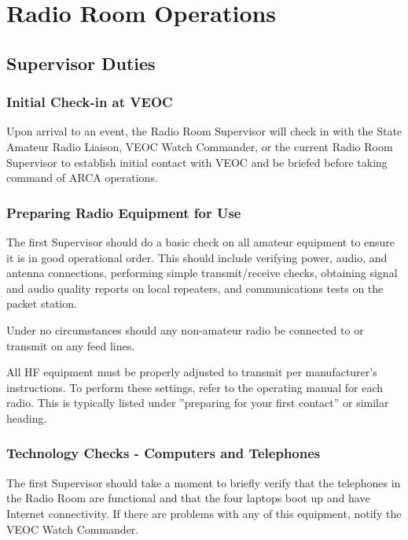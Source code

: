 \documentclass[pdflatex,letterpaper,twoside,12pt]{book}
\begin{document}
\chapter{Radio Room Operations}

\section{Supervisor Duties}

\subsection{Initial Check-in at VEOC}

Upon arrival to an event, the Radio Room Supervisor will check in with the State Amateur Radio Liaison, VEOC Watch Commander, or the current Radio Room Supervisor to establish initial contact with VEOC and be briefed before taking command of ARCA operations.

\subsection{Preparing Radio Equipment for Use}

The first Supervisor should do a basic check on all amateur equipment to ensure it is in good operational order.  This should include verifying power, audio, and antenna connections, performing simple transmit/receive checks, obtaining signal and audio quality reports on local repeaters, and communications tests on the packet station.

Under no circumstances should any non-amateur radio be connected to or transmit on any feed lines.

All HF equipment must be properly adjusted to transmit per manufacturer's instructions.  To perform these settings, refer to the operating manual for each radio.  This is typically listed under ''preparing for your first contact'' or similar heading.

\subsection{Technology Checks - Computers and Telephones}

The first Supervisor should take a moment to briefly verify that the telephones in the Radio Room are functional and that the four laptops boot up and have Internet connectivity.  If there are problems with any of this equipment, notify the VEOC Watch Commander.
\end{document}
